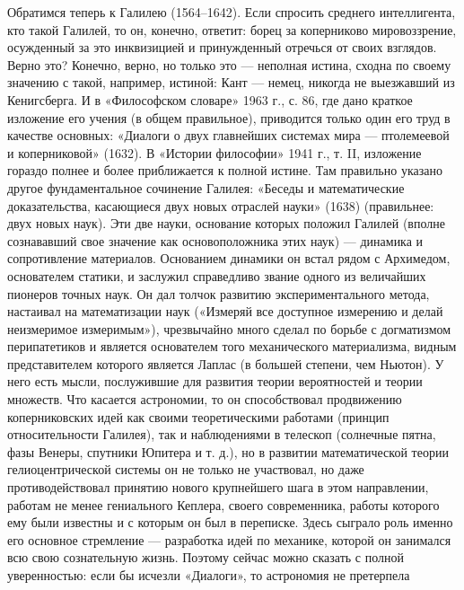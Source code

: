 Обратимся  теперь  к  Галилею  (1564--1642).  Если  спросить  среднего
интеллигента,  кто  такой  Галилей,  то он,  конечно,  ответит:  борец
за  коперниково   мировоззрение,  осужденный  за  это   инквизицией  и
принужденный отречься  от своих  взглядов. Верно это?  Конечно, верно,
но  только  это ---  неполная  истина,  сходна  по своему  значению  с
такой, например,  истиной: Кант  --- немец,  никогда не  выезжавший из
Кенигсберга.  И в  «Философском  словаре»  1963 г.,  с.  86, где  дано
краткое изложение  его учения (в общем  правильное), приводится только
один его труд в качестве основных: «Диалоги о двух главнейших системах
мира  --- птолемеевой  и коперниковой»  (1632). В  «Истории философии»
1941  г., т.  II,  изложение  гораздо полнее  и  более приближается  к
полной истине. Там правильно  указано другое фундаментальное сочинение
Галилея:  «Беседы  и  математические доказательства,  касающиеся  двух
новых  отраслей  науки»  (1638)  (правильнее: двух  новых  наук).  Эти
две  науки,  основание  которых положил  Галилей  (вполне  сознававший
свое  значение   как  основоположника   этих  наук)  ---   динамика  и
сопротивление  материалов.  Основанием  динамики   он  встал  рядом  с
Архимедом,   основателем  статики,   и  заслужил   справедливо  звание
одного  из величайших  пионеров точных  наук. Он  дал толчок  развитию
экспериментального метода,  настаивал на математизации  наук («Измеряй
все доступное  измерению и делай неизмеримое  измеримым»), чрезвычайно
много  сделал  по  борьбе   с  догматизмом  перипатетиков  и  является
основателем  того  механического материализма,  видным  представителем
которого  является Лаплас  (в  большей степени,  чем  Ньютон). У  него
есть  мысли, послужившие  для  развития теории  вероятностей и  теории
множеств.  Что касается  астрономии, то  он способствовал  продвижению
коперниковских  идей  как   своими  теоретическими  работами  (принцип
относительности  Галилея), так  и наблюдениями  в телескоп  (солнечные
пятна,  фазы  Венеры,  спутники  Юпитера  и  т.  д.),  но  в  развитии
математической  теории  гелиоцентрической  системы  он  не  только  не
участвовал,  но  даже  противодействовал принятию  нового  крупнейшего
шага  в  этом  направлении,  работам  не  менее  гениального  Кеплера,
своего современника,  работы которого  ему были  известны и  с которым
он  был   в  переписке.  Здесь   сыграло  роль  именно   его  основное
стремление --- разработка  идей по механике, которой  он занимался всю
свою  сознательную  жизнь.  Поэтому  сейчас  можно  сказать  с  полной
уверенностью: если  бы исчезли «Диалоги», то  астрономия не претерпела
